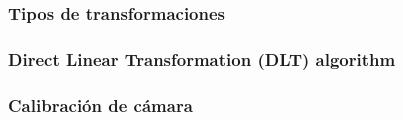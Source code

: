 \begin{frame}
	\frametitle{Tipos de transformaciones}
	\footnotesize
	
\end{frame}


\begin{frame}
    \frametitle{Direct Linear Transformation (DLT) algorithm}
    \footnotesize
    
\end{frame}



\begin{frame}
	\frametitle{Calibración de cámara}
	\footnotesize
	
	
\end{frame}



